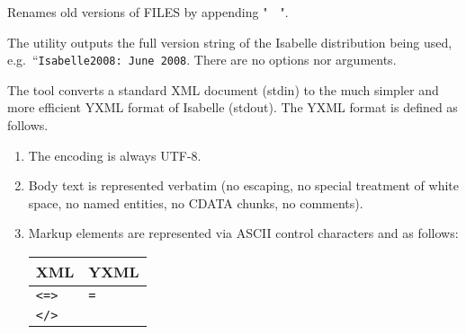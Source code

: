 \begin{isabellebody}
\begin{isamarkuptext}
\begin{ttbox}
  Renames old versions of FILES by appending "~~".
\end{ttbox}%
\end{isamarkuptext}%
\isamarkuptrue%
%
\isamarkuptrue%
%
\begin{isamarkuptext}%
The \hypertarget{tool.version}{\hyperlink{tool.version}{\mbox{}}} utility outputs the full version string of
  the Isabelle distribution being used, e.g.\ ``\verb|Isabelle2008: June 2008|.  There are no options nor arguments.%
\end{isamarkuptext}%
\isamarkuptrue%
%
\isamarkuptrue%
%
\begin{isamarkuptext}%
The \hypertarget{tool.yxml}{\hyperlink{tool.yxml}{\mbox{}}} tool converts a standard XML document (stdin)
  to the much simpler and more efficient YXML format of Isabelle
  (stdout).  The YXML format is defined as follows.

  \begin{enumerate}

  \item The encoding is always UTF-8.

  \item Body text is represented verbatim (no escaping, no special
  treatment of white space, no named entities, no CDATA chunks, no
  comments).

  \item Markup elements are represented via ASCII control characters
   and  as follows:

  \begin{tabular}{ll}
    XML & YXML \\\hline
    \verb|<|\isa{{\isachardoublequote}name\ attribute{\isachardoublequote}}\verb|=|\isa{{\isachardoublequote}value\ {\isasymdots}{\isachardoublequote}}\verb|>| &
    \isa{{\isachardoublequote}\isactrlbold X\isactrlbold Yname\isactrlbold Yattribute{\isachardoublequote}}\verb|=|\isa{{\isachardoublequote}value{\isasymdots}\isactrlbold X{\isachardoublequote}} \\
    \verb|</|\isa{name}\verb|>| & \isa{{\isachardoublequote}\isactrlbold X\isactrlbold Y\isactrlbold X{\isachardoublequote}} \\
  \end{tabular}


\end{enumerate}
\end{isamarkuptext}
\end{isabellebody}
